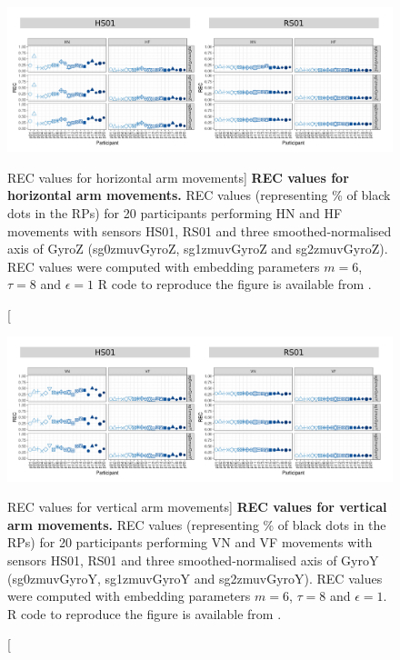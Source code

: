 \begin{figure}
\centering
\includegraphics[width=1.0\textwidth]{rec_aH}
    \caption
	[REC values for horizontal arm movements]{
	{\bf REC values for horizontal arm movements.}	
	REC values (representing \% of black dots in the RPs) for 
	20 participants performing HN and HF movements
	with sensors HS01, RS01 and three smoothed-normalised axis 
	of GyroZ (sg0zmuvGyroZ, sg1zmuvGyroZ and sg2zmuvGyroZ).
	REC values were computed with 
	embedding parameters $m=6$, $\tau=8$ and $\epsilon=1$
	R code to reproduce the figure is available from \cite{hwum2018}.
        }
    \label{fig:rec_aH}
\end{figure}
\begin{figure}
\centering
\includegraphics[width=1.0\textwidth]{rec_aV}
    \caption
	[REC values for vertical arm movements]{
	{\bf REC values for vertical arm movements.}	
	REC values (representing \% of black dots in the RPs) for 
	20 participants performing VN and VF movements
	with sensors HS01, RS01 and three smoothed-normalised axis 
	of GyroY (sg0zmuvGyroY, sg1zmuvGyroY and sg2zmuvGyroY).
	REC values were computed with 
	embedding parameters $m=6$, $\tau=8$ and $\epsilon=1$.
	R code to reproduce the figure is available from \cite{hwum2018}.
        }
    \label{fig:rec_aV}
\end{figure}


